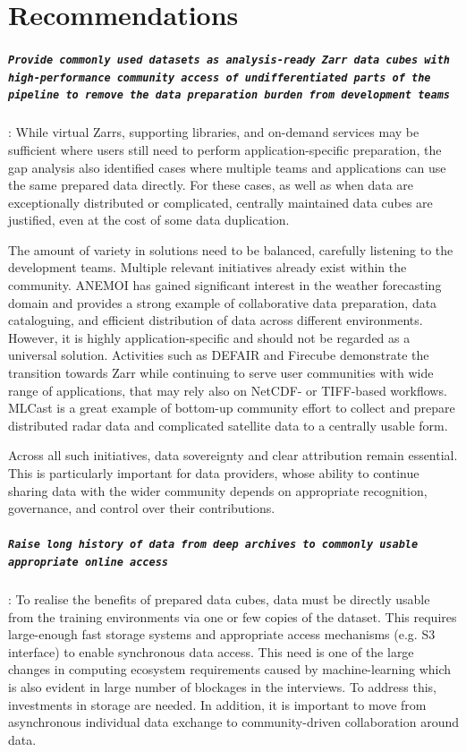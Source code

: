 \documentclass[acmtog,nonacm]{acmart}
\begin{document}
\section{Recommendations}

\subparagraph{\texttt{Provide commonly used datasets as analysis-ready Zarr data cubes with high-performance community access of undifferentiated parts of the pipeline to remove the data preparation burden from development teams}} 
:\newline
While virtual Zarrs, supporting libraries, and on-demand services may be sufficient where users still need to perform application-specific preparation, the gap analysis also identified cases where multiple teams and applications can use the same prepared data directly. For these cases, as well as when data are exceptionally distributed or complicated, centrally maintained data cubes are justified, even at the cost of some data duplication.

The amount of variety in solutions need to be balanced, carefully listening to the development teams. Multiple relevant initiatives already exist within the community. ANEMOI has gained significant interest in the weather forecasting domain and provides a strong example of collaborative data preparation, data cataloguing, and efficient distribution of data across different environments. However, it is highly application-specific and should not be regarded as a universal solution. Activities such as DEFAIR and Firecube demonstrate the transition towards Zarr while continuing to serve user communities with wide range of applications, that may rely also on NetCDF- or TIFF-based workflows. MLCast is a great example of bottom-up community effort to collect and prepare distributed radar data and complicated satellite data to a centrally usable form.  

Across all such initiatives, data sovereignty and clear attribution remain essential. This is particularly important for data providers, whose ability to continue sharing data with the wider community depends on appropriate recognition, governance, and control over their contributions.

\subparagraph{\texttt{Raise long history of data from deep archives to commonly usable appropriate online access}} 
:\newline
To realise the benefits of prepared data cubes, data must be directly usable from the training environments via one or few copies of the dataset. This requires large-enough fast storage systems and appropriate access mechanisms (e.g. S3 interface) to enable synchronous data access. This need is one of the large changes in computing ecosystem requirements caused by machine-learning which is also evident in large number of blockages in the interviews. To address this, investments in storage are needed. In addition, it is important to move from asynchronous individual data exchange to community-driven collaboration around data.
\end{document}
